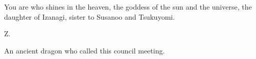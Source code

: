\documentclass[char]{guardians}
\begin{document}
\name{\cAmaterasu{}}

You are \cAmaterasu{\intro} who shines in the heaven, the goddess of the sun and the universe, the daughter of Izanagi, sister to Susanoo and Tsukuyomi.

\begin{itemz}[Goals]
  \item Z.
\end{itemz}


\begin{contacts}
  \contact{\cCaretaker{}} An ancient dragon who called this council meeting.
\end{contacts}
\end{document}
